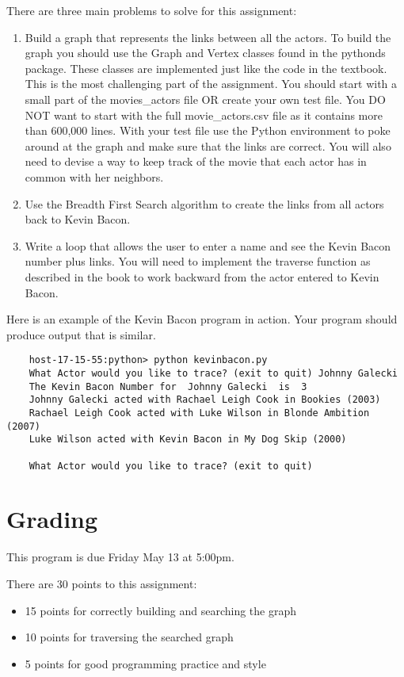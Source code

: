 \documentclass[11pt]{article}
\begin{document}
There are three main problems to solve for this assignment:
\begin{enumerate}
    \item  Build a graph that represents the links between all the actors.  To build the graph you should use the Graph and Vertex classes found in the pythonds package.  These classes are implemented just like the code in the textbook.  This is the most challenging part of the assignment.  You should start with a small part of the movies\_actors file OR create your own test file. You DO NOT want to start with the full movie\_actors.csv file as it contains more than 600,000 lines.  With your test file use the Python environment to poke around at the graph and make sure that the links are correct.  You will also need to devise a way to keep track of the movie that each actor has in common with her neighbors.

    \item  Use the Breadth First Search algorithm to create the links from all actors back to Kevin Bacon.

    \item  Write a loop that allows the user to enter a name and see the Kevin Bacon number plus links.  You will need to implement the traverse function as described in the book to work backward from the actor entered to Kevin Bacon.

\end{enumerate}
Here is an example of the Kevin Bacon program in action.  Your program should produce output that is similar.
\begin{verbatim}
    host-17-15-55:python> python kevinbacon.py
    What Actor would you like to trace? (exit to quit) Johnny Galecki
    The Kevin Bacon Number for  Johnny Galecki  is  3
    Johnny Galecki acted with Rachael Leigh Cook in Bookies (2003)
    Rachael Leigh Cook acted with Luke Wilson in Blonde Ambition (2007)
    Luke Wilson acted with Kevin Bacon in My Dog Skip (2000)

    What Actor would you like to trace? (exit to quit)
\end{verbatim}

\section{Grading}
This program is due Friday May 13 at 5:00pm.

There are 30 points to this assignment:
\begin{itemize}
\item 15 points for correctly building and searching the graph
\item 10 points for traversing the searched graph
\item 5 points for good programming practice and style
\end{itemize}
\end{document}
